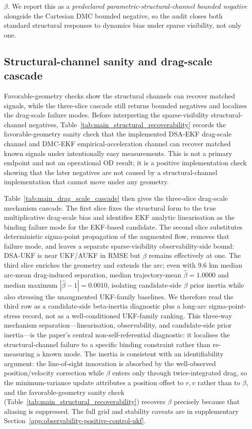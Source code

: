 \documentclass{article}
\begin{document}
$\beta$. We report this as a \emph{predeclared parametric-structural-channel bounded negative} alongside the Cartesian DMC bounded negative, so the audit closes both standard structural responses to dynamics bias under sparse visibility, not only one.

\subsection{Structural-channel sanity and drag-scale cascade}\label{sec:drag-scale-cascade}
Favorable-geometry checks show the structural channels can recover matched signals, while the three-slice cascade still returns bounded negatives and localizes the drag-scale failure modes.
Before interpreting the sparse-visibility structural-channel negatives, Table~\ref{tab:main_structural_recoverability} records the favorable-geometry sanity check that the implemented DSA-EKF drag-scale channel and DMC-EKF empirical-acceleration channel can recover matched known signals under intentionally easy measurements. This is not a primary endpoint and not an operational OD result; it is a positive implementation check showing that the later negatives are not caused by a structural-channel implementation that cannot move under any geometry.



Table~\ref{tab:main_drag_scale_cascade} then gives the three-slice drag-scale mechanism cascade. The first slice fixes the structural form to the true multiplicative drag-scale bias and identifies EKF analytic linearisation as the binding failure mode for the EKF-based candidate. The second slice substitutes deterministic sigma-point propagation of the augmented flow, removes that failure mode, and leaves a separate sparse-visibility observability-side bound: DSA-UKF is near UKF/AUKF in RMSE but $\hat{\beta}$ remains effectively at one. The third slice enriches the geometry and extends the arc; even with 9.6 km median arc-mean drag-induced separation, median trajectory-mean \(\hat{\beta}=1.0000\) and median maximum \(|\hat{\beta}-1|=0.0010\), isolating candidate-side \(\beta\) prior inertia while also stressing the unaugmented UKF-family baselines. We therefore read the third row as a candidate-side beta-inertia diagnostic plus a long-arc sigma-point-stress record, not as a well-conditioned UKF-family ranking. This three-way mechanism separation---linearisation, observability, and candidate-side prior inertia---is the paper's central non-self-referential diagnostic: it localises the structural-channel failure to a specific binding constraint rather than re-measuring a known mode. The inertia is consistent with an identifiability argument: the line-of-sight innovation is absorbed by the well-observed position/velocity correction while \(\beta\) enters only through twice-integrated drag, so the minimum-variance update attributes a position offset to \(r,v\) rather than to \(\beta\), and the favorable-geometry sanity check (Table~\ref{tab:main_structural_recoverability}) recovers \(\beta\) precisely because that aliasing is suppressed. The full grid and stability caveats are in supplementary Section~\ref{app:observability-positive-control-ukf}.
\end{document}
